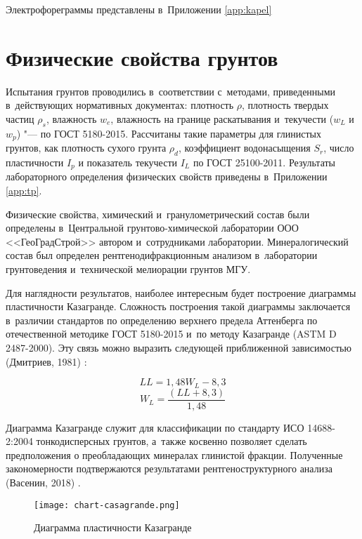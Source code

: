 Электрофореграммы представлены в~Приложении \ref{app:kapel}


\section{Физические свойства грунтов}

Испытания грунтов проводились в~соответствии с~методами, приведенными в~действующих нормативных документах:
плотность $\rho$, 
плотность твердых частиц $\rho_s$, 
влажность $w_e$, 
влажность на границе раскатывания и~текучести ($w_L$ и~$w_p$) "--- по ГОСТ 5180-2015. 
Рассчитаны такие параметры для глинистых грунтов, как
плотность сухого грунта $\rho_d$,  
коэффициент водонасыщения $S_r$, 
число пластичности $I_p$ 
и показатель текучести $I_L$ по ГОСТ 25100-2011.
Результаты лабораторного определения физических свойств приведены в~Приложении \ref{app:tp}.



Физические свойства, химический и~гранулометрический состав были определены в~Центральной грунтово-химической лаборатории ООО <<ГеоГрадСтрой>> автором и~сотрудниками лаборатории. Минералогический состав был определен рентгенодифракционным анализом в~лаборатории грунтоведения и~технической мелиорации грунтов МГУ.


Для наглядности результатов, наиболее интересным будет построение диаграммы пластичности Казагранде. Сложность построения такой диаграммы заключается в~различии  стандартов по определению верхнего предела Аттенберга по отечественной методике ГОСТ 5180-2015 и~по методу Казагранде (ASTM D 2487-2000). Эту связь можно выразить следующей приближенной зависимостью (Дмитриев, 1981) \cite{dmitriev1981}:

$$LL = 1,48W_L - 8,3$$
$$W_L = {\frac{(LL + 8,3)}{1,48}}$$

Диаграмма Казагранде служит для классификации по стандарту ИСО 14688-2:2004 тонкодисперсных грунтов, а~также косвенно позволяет сделать предположения о преобладающих минералах глинистой фракции. Полученные закономерности подтвержаются результатами рентгеноструктурного анализа (Васенин, 2018) \cite{vasenin2018}.


\begin{figure}[ht]
    \small
    \centering
    \texttt{[image: chart-casagrande.png]}
    \caption{Диаграмма пластичности Казагранде} \label{Fig:Caz}
  \end{figure}


